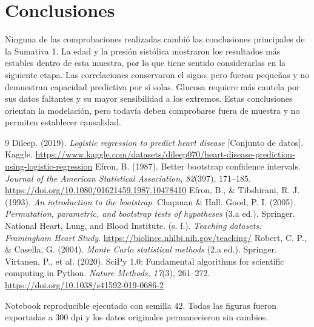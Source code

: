 \documentclass[10pt,a4paper]{article}
\begin{document}
\section{Conclusiones}

Ninguna de las comprobaciones realizadas cambió las conclusiones principales
de la Sumativa 1. La edad y la presión sistólica mostraron los resultados más
estables dentro de esta muestra, por lo que tiene sentido considerarlas en la
siguiente etapa. Las correlaciones conservaron el signo, pero fueron pequeñas
y no demuestran capacidad predictiva por sí solas. Glucosa requiere más
cautela por sus datos faltantes y su mayor sensibilidad a los extremos. Estas
conclusiones orientan la modelación, pero todavía deben comprobarse fuera de
muestra y no permiten establecer causalidad.

\small
\begin{thebibliography}{9}
 Dileep. (2019). \textit{Logistic regression to predict heart disease} [Conjunto de datos]. Kaggle. \url{https://www.kaggle.com/datasets/dileep070/heart-disease-prediction-using-logistic-regression}
 Efron, B. (1987). Better bootstrap confidence intervals. \textit{Journal of the American Statistical Association, 82}(397), 171--185. \url{https://doi.org/10.1080/01621459.1987.10478410}
 Efron, B., \& Tibshirani, R. J. (1993). \textit{An introduction to the bootstrap}. Chapman \& Hall.
 Good, P. I. (2005). \textit{Permutation, parametric, and bootstrap tests of hypotheses} (3.a ed.). Springer.
 National Heart, Lung, and Blood Institute. (s. f.). \textit{Teaching datasets: Framingham Heart Study}. \url{https://biolincc.nhlbi.nih.gov/teaching/}
 Robert, C. P., \& Casella, G. (2004). \textit{Monte Carlo statistical methods} (2.a ed.). Springer.
 Virtanen, P., et al. (2020). SciPy 1.0: Fundamental algorithms for scientific computing in Python. \textit{Nature Methods, 17}(3), 261--272. \url{https://doi.org/10.1038/s41592-019-0686-2}
\end{thebibliography}

\vfill
\begin{center}\footnotesize
Notebook reproducible ejecutado con semilla 42. Todas las figuras fueron
exportadas a 300 dpi y los datos originales permanecieron sin cambios.
\end{center}
\end{document}
